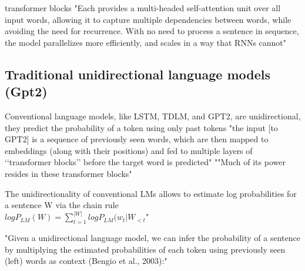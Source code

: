 
transformer blocks "Each provides a multi-headed self-attention unit over all input words, allowing it to capture multiple dependencies between words, while avoiding the need for recurrence. With no need to process a sentence in sequence, the model parallelizes more efficiently, and scales in a way that RNNs cannot" \citep{lau2020furiously}


\subsection{Traditional unidirectional language models (Gpt2)}



Conventional language models, like LSTM, TDLM, and GPT2, are unidirectional, they predict the probability of a token using only past tokens
"the input [to GPT2] is a sequence of previously seen words, which are then mapped to embeddings (along with their positions) and fed to multiple layers of ‘‘transformer blocks’’ before the target word is predicted" ""Much of its power resides in these transformer blocks" \citep{lau2020furiously}


The unidirectionality of conventional LMs allows to estimate log probabilities for a sentence W via the chain rule \citep{salazar2020masked} \\
$log P_{LM}(W) = \sum_{t=1}^{|W|} log P_{LM}(w_t | W_{<t}$" 

"Given a unidirectional language model, we can infer the probability of a sentence by multiplying the estimated probabilities of each token using
previously seen (left) words as context (Bengio et al., 2003):" \citep{lau2020furiously}

